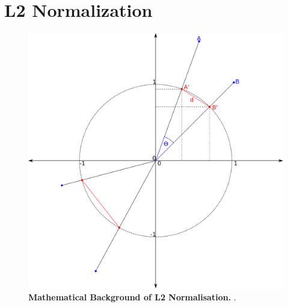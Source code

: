 \section{L2 Normalization} \label{sec:L2_Normalization}

\begin{figure}[!hbt]
    \centering
    \includegraphics[width=\dimexpr\textwidth-2\fboxsep-2\fboxrule,fbox]{Graphics/L2_Euclidean.pdf}
    \caption[Mathematical Background of L2 Normalisation]{\textbf{Mathematical Background of L2 Normalisation.} .}
    \label{fig:L2_Normalisation_Background}
\end{figure}

\blindtext

